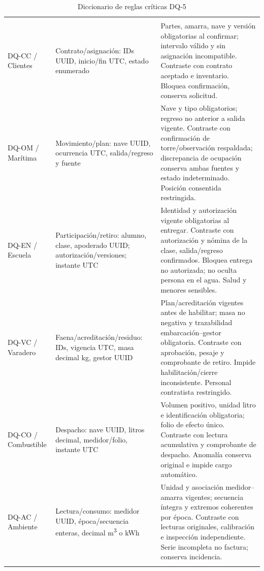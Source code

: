 \begingroup
\setlength{\tabcolsep}{3pt}
\begin{longtable}{@{}L{.14\textwidth}L{.31\textwidth}L{\dimexpr.55\textwidth-12pt\relax}@{}}
\caption{Diccionario de reglas críticas DQ-5}\label{tab:sd5_diccionario_calidad}\\\hline
{} &  &  \\\hline\endfirsthead
\hline{} &  &  \\\hline\endhead
DQ-CC / Clientes & Contrato/asignación: IDs UUID, inicio/fin UTC, estado enumerado & Partes, amarra, nave y versión obligatorias al confirmar; intervalo válido y sin asignación incompatible. Contraste con contrato aceptado e inventario. Bloquea confirmación, conserva solicitud. \\\addlinespace\hline
DQ-OM / Marítima & Movimiento/plan: nave UUID, ocurrencia UTC, salida/regreso y fuente & Nave y tipo obligatorios; regreso no anterior a salida vigente. Contraste con confirmación de torre/observación respaldada; discrepancia de ocupación conserva ambas fuentes y estado indeterminado. Posición consentida restringida. \\\addlinespace\hline
DQ-EN / Escuela & Participación/retiro: alumno, clase, apoderado UUID; autorización/versiones; instante UTC & Identidad y autorización vigente obligatorias al entregar. Contraste con autorización y nómina de la clase, salida/regreso confirmados. Bloquea entrega no autorizada; no oculta persona en el agua. Salud y menores sensibles. \\\addlinespace\hline
DQ-VC / Varadero & Faena/acreditación/residuo: IDs, vigencia UTC, masa decimal kg, gestor UUID & Plan/acreditación vigentes antes de habilitar; masa no negativa y trazabilidad embarcación--gestor obligatoria. Contraste con aprobación, pesaje y comprobante de retiro. Impide habilitación/cierre inconsistente. Personal contratista restringido. \\\addlinespace\hline
DQ-CO / Combustible & Despacho: nave UUID, litros decimal, medidor/folio, instante UTC & Volumen positivo, unidad litro e identificación obligatoria; folio de efecto único. Contraste con lectura acumulativa y comprobante de despacho. Anomalía conserva original e impide cargo automático. \\\addlinespace\hline
DQ-AC / Ambiente & Lectura/consumo: medidor UUID, época/secuencia enteras, decimal m\textsuperscript{3} o kWh & Unidad y asociación medidor--amarra vigentes; secuencia íntegra y extremos coherentes por época. Contraste con lecturas originales, calibración e inspección independiente. Serie incompleta no factura; conserva incidencia. \\\addlinespace\hline

\end{longtable}
